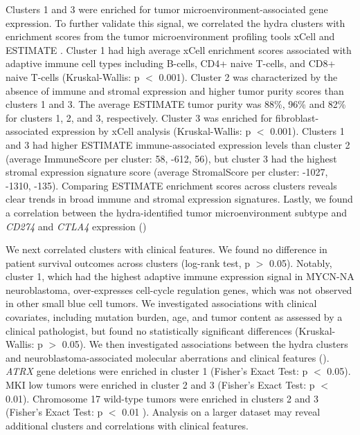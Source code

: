 \documentclass[10pt,letterpaper]{article}
\begin{document}
Clusters 1 and 3 were enriched for tumor microenvironment-associated gene expression. To further validate this signal, we correlated the hydra clusters with enrichment scores from the tumor microenvironment profiling tools xCell \cite{aranXCellDigitallyPortraying2017} and ESTIMATE \cite{yoshiharaInferringTumourPurity2013a}. Cluster 1 had high average xCell enrichment scores associated with adaptive immune cell types including B-cells, CD4+ naive T-cells, and CD8+ naive T-cells (Kruskal-Wallis: p $<$ 0.001). Cluster 2 was characterized by the absence of immune and stromal expression and higher tumor purity scores than clusters 1 and 3. The average ESTIMATE tumor purity was 88\%, 96\% and 82\% for clusters 1, 2, and 3, respectively. Cluster 3 was enriched for fibroblast-associated expression by xCell analysis (Kruskal-Wallis: p $<$ 0.001). Clusters 1 and 3 had higher ESTIMATE immune-associated expression levels than cluster 2 (average ImmuneScore per cluster: 58, -612, 56), but cluster 3 had the highest stromal expression signature score (average StromalScore per cluster: -1027, -1310, -135). Comparing ESTIMATE enrichment scores across clusters reveals clear trends in broad immune and stromal expression signatures. Lastly, we found a correlation between the hydra-identified tumor microenvironment subtype and \textit{CD274} and \textit{CTLA4} expression ()

We next correlated clusters with clinical features. We found no difference in patient survival outcomes across clusters (log-rank test, p $>$ 0.05). Notably, cluster 1, which had the highest adaptive immune expression signal in MYCN-NA neuroblastoma, over-expresses cell-cycle regulation genes, which was not observed in other small blue cell tumors. We investigated associations with clinical covariates, including mutation burden, age, and tumor content as assessed by a clinical pathologist, but found no statistically significant differences (Kruskal-Wallis: p $>$ 0.05). We then investigated associations between the hydra clusters and neuroblastoma-associated molecular aberrations and clinical features (). \textit{ATRX} gene deletions were enriched in cluster 1 (Fisher’s Exact Test: p $<$ 0.05). MKI low tumors were enriched in cluster 2 and 3 (Fisher’s Exact Test: p $<$ 0.01). Chromosome 17 wild-type tumors were enriched in clusters 2 and 3 (Fisher’s Exact Test: p $<$ 0.01 ). Analysis on a larger dataset may reveal additional clusters and correlations with clinical features.
\end{document}
